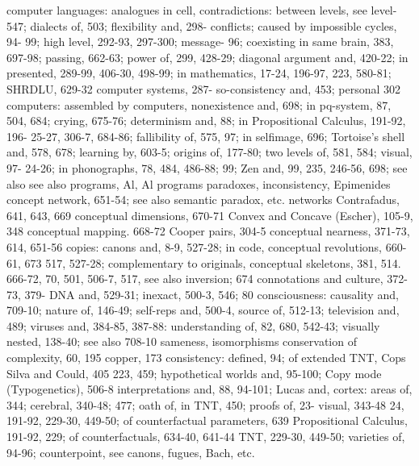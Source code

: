 computer languages: analogues in cell,         contradictions: between levels, see level-
547; dialects of, 503; flexibility and, 298-   conflicts; caused by impossible cycles, 94-
99; high level, 292-93, 297-300; message-      96; coexisting in same brain, 383, 697-98;
passing, 662-63; power of, 299, 428-29;        diagonal argument and, 420-22; in
presented, 289-99, 406-30, 498-99; in          mathematics, 17-24, 196-97, 223, 580-81;
SHRDLU, 629-32 computer systems, 287-          so-consistency     and,     453;    personal
302 computers: assembled by computers,         nonexistence and, 698; in pq-system, 87,
504, 684; crying, 675-76; determinism and,     88; in Propositional Calculus, 191-92, 196-
25-27, 306-7, 684-86; fallibility of, 575,     97; in selfimage, 696; Tortoise's shell and,
578, 678; learning by, 603-5; origins of,      177-80; two levels of, 581, 584; visual, 97-
24-26; in phonographs, 78, 484, 486-88;        99; Zen and, 99, 235, 246-56, 698; see also
see also programs, Al, Al programs             paradoxes, inconsistency, Epimenides
concept network, 651-54; see also semantic     paradox, etc.
networks                                       Contrafadus, 641, 643, 669
conceptual dimensions, 670-71                  Convex and Concave (Escher), 105-9, 348
conceptual mapping. 668-72                     Cooper pairs, 304-5
conceptual nearness, 371-73, 614, 651-56       copies: canons and, 8-9, 527-28; in code,
conceptual revolutions, 660-61, 673            517, 527-28; complementary to originals,
conceptual skeletons, 381, 514. 666-72,        70, 501, 506-7, 517, see also inversion;
674 connotations and culture, 372-73, 379-     DNA and, 529-31; inexact, 500-3, 546;
80 consciousness: causality and, 709-10;       nature of, 146-49; self-reps and, 500-4,
source of,                                     512-13; television and, 489; viruses and,
384-85, 387-88: understanding of, 82, 680,     542-43; visually nested, 138-40; see also
708-10                                         sameness, isomorphisms
conservation of complexity, 60, 195            copper, 173
consistency: defined, 94; of extended TNT,     Cops Silva and Could, 405
223, 459; hypothetical worlds and, 95-100;     Copy mode (Typogenetics), 506-8
interpretations and, 88, 94-101; Lucas and,    cortex: areas of, 344; cerebral, 340-48;
477; oath of, in TNT, 450; proofs of, 23-      visual, 343-48
24,    191-92,     229-30,     449-50;    of   counterfactual parameters, 639
Propositional Calculus, 191-92, 229; of        counterfactuals,       634-40,       641-44
TNT, 229-30, 449-50; varieties of, 94-96;      counterpoint, see canons, fugues, Bach, etc.
